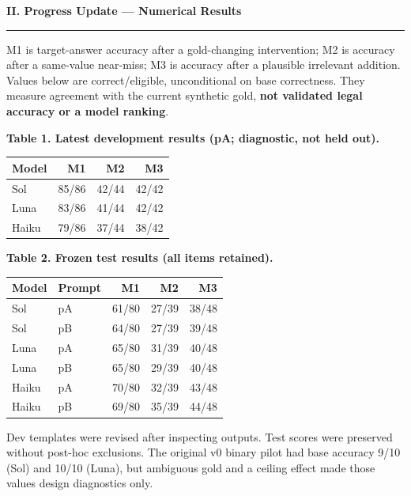 \documentclass[12pt,a4paper]{article}
\newcommand{\heading}[1]{\textbf{#1}\par\nobreak\vspace{2pt}\hrule\vspace{4pt}}
\begin{document}
\begin{mdframed}[style=vinframe]
\heading{II. Progress Update --- Numerical Results}
M1 is target-answer accuracy after a gold-changing intervention; M2 is accuracy after a same-value near-miss; M3 is accuracy after a plausible irrelevant addition. Values below are correct/eligible, unconditional on base correctness. They measure agreement with the current synthetic gold, \textbf{not validated legal accuracy or a model ranking}.

\textbf{Table 1. Latest development results (pA; diagnostic, not held out).}
\begin{center}
\setlength{\tabcolsep}{10pt}
\begin{tabular}{lrrr}
\toprule
Model & M1 & M2 & M3\\
\midrule
Sol & 85/86 & 42/44 & 42/42\\
Luna & 83/86 & 41/44 & 42/42\\
Haiku & 79/86 & 37/44 & 38/42\\
\bottomrule
\end{tabular}
\end{center}
\textbf{Table 2. Frozen test results (all items retained).}
\begin{center}
\setlength{\tabcolsep}{9pt}
\begin{tabular}{llrrr}
\toprule
Model & Prompt & M1 & M2 & M3\\
\midrule
Sol & pA & 61/80 & 27/39 & 38/48\\
Sol & pB & 64/80 & 27/39 & 39/48\\
Luna & pA & 65/80 & 31/39 & 40/48\\
Luna & pB & 65/80 & 29/39 & 40/48\\
Haiku & pA & 70/80 & 32/39 & 43/48\\
Haiku & pB & 69/80 & 35/39 & 44/48\\
\bottomrule
\end{tabular}
\end{center}
Dev templates were revised after inspecting outputs. Test scores were preserved without post-hoc exclusions. The original v0 binary pilot had base accuracy 9/10 (Sol) and 10/10 (Luna), but ambiguous gold and a ceiling effect made those values design diagnostics only.

\end{mdframed}
\newpage
\end{document}
